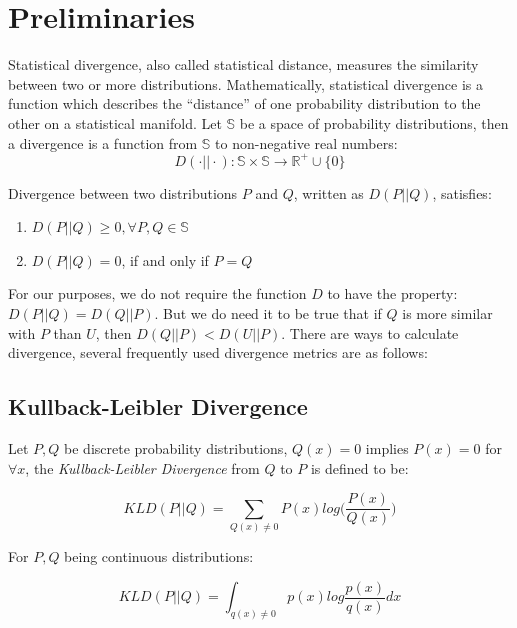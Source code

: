 \documentclass[10pt,conference,letterpaper]{article}
\begin{document}
	
	\section{Preliminaries}\label{sec:preliminaries}
		Statistical divergence, also called statistical distance, measures the similarity between two or more distributions.
		Mathematically, statistical divergence is a function which describes the ``distance'' of one probability distribution to the other on a statistical manifold. Let $\mathbb{S}$ be a space of probability distributions, then a divergence is a function from $\mathbb{S}$ to non-negative real numbers: 
		\begin{equation}
			D(\cdot || \cdot): \mathbb{S} \times \mathbb{S} \rightarrow \mathbb{R^+} \cup \{0\}
		\end{equation}
	
		Divergence between two distributions $P$ and $Q$, written as $D(P||Q)$, satisfies:
	
		\begin{enumerate}
			\item $D(P||Q) \ge 0, \forall P, Q \in \mathbb{S}$
			\item $D(P||Q) = 0$, if and only if $P=Q$
		\end{enumerate}
	
		For our purposes, we do not require the function $D$ to have the property: $D(P||Q) = D(Q||P)$. But we do need it to be true that if $Q$ is more similar with $P$ than $U$, then $D(Q||P) < D(U||P)$. There are ways to calculate divergence,	several frequently used divergence metrics are as follows:
	
		\subsection{Kullback-Leibler Divergence}
			Let $P,Q$ be discrete probability distributions, $Q(x)=0$ implies $P(x)=0$ for $\forall x$, the \textit{Kullback-Leibler Divergence} from $Q$ to $P$ is defined to be:
	
			\begin{equation}
				KLD(P||Q) = \sum_{Q(x)\ne 0} P(x)log\Big(\frac{P(x)}{Q(x)}\Big)
			\end{equation}
	
			For $P,Q$ being continuous distributions:
	
			\begin{equation}
				KLD(P||Q) = \int_{q(x) \ne 0} p(x)log\frac{p(x)}{q(x)}dx
			\end{equation}
	
\end{document}
